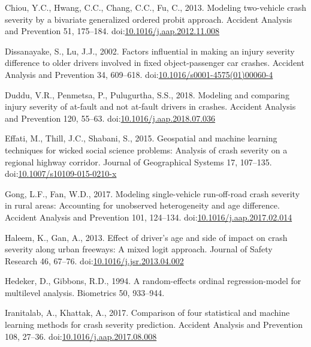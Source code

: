 \documentclass[]{elsarticle} %
\begin{document}
\leavevmode\hypertarget{ref-Chiou2013modeling}{}%
Chiou, Y.C., Hwang, C.C., Chang, C.C., Fu, C., 2013. Modeling
two-vehicle crash severity by a bivariate generalized ordered probit
approach. Accident Analysis and Prevention 51, 175--184.
doi:\href{https://doi.org/10.1016/j.aap.2012.11.008}{10.1016/j.aap.2012.11.008}

\leavevmode\hypertarget{ref-Dissanayake2002factors}{}%
Dissanayake, S., Lu, J.J., 2002. Factors influential in making an injury
severity difference to older drivers involved in fixed object-passenger
car crashes. Accident Analysis and Prevention 34, 609--618.
doi:\href{https://doi.org/10.1016/s0001-4575(01)00060-4}{10.1016/s0001-4575(01)00060-4}

\leavevmode\hypertarget{ref-Duddu2018modeling}{}%
Duddu, V.R., Penmetsa, P., Pulugurtha, S.S., 2018. Modeling and
comparing injury severity of at-fault and not at-fault drivers in
crashes. Accident Analysis and Prevention 120, 55--63.
doi:\href{https://doi.org/10.1016/j.aap.2018.07.036}{10.1016/j.aap.2018.07.036}

\leavevmode\hypertarget{ref-Effati2015geospatial}{}%
Effati, M., Thill, J.C., Shabani, S., 2015. Geospatial and machine
learning techniques for wicked social science problems: Analysis of
crash severity on a regional highway corridor. Journal of Geographical
Systems 17, 107--135.
doi:\href{https://doi.org/10.1007/s10109-015-0210-x}{10.1007/s10109-015-0210-x}

\leavevmode\hypertarget{ref-Gong2017modeling}{}%
Gong, L.F., Fan, W.D., 2017. Modeling single-vehicle run-off-road crash
severity in rural areas: Accounting for unobserved heterogeneity and age
difference. Accident Analysis and Prevention 101, 124--134.
doi:\href{https://doi.org/10.1016/j.aap.2017.02.014}{10.1016/j.aap.2017.02.014}

\leavevmode\hypertarget{ref-Haleem2013effect}{}%
Haleem, K., Gan, A., 2013. Effect of driver's age and side of impact on
crash severity along urban freeways: A mixed logit approach. Journal of
Safety Research 46, 67--76.
doi:\href{https://doi.org/10.1016/j.jsr.2013.04.002}{10.1016/j.jsr.2013.04.002}

\leavevmode\hypertarget{ref-Hedeker1994random}{}%
Hedeker, D., Gibbons, R.D., 1994. A random-effects ordinal
regression-model for multilevel analysis. Biometrics 50, 933--944.

\leavevmode\hypertarget{ref-Iranitalab2017comparison}{}%
Iranitalab, A., Khattak, A., 2017. Comparison of four statistical and
machine learning methods for crash severity prediction. Accident
Analysis and Prevention 108, 27--36.
doi:\href{https://doi.org/10.1016/j.aap.2017.08.008}{10.1016/j.aap.2017.08.008}
\end{document}
